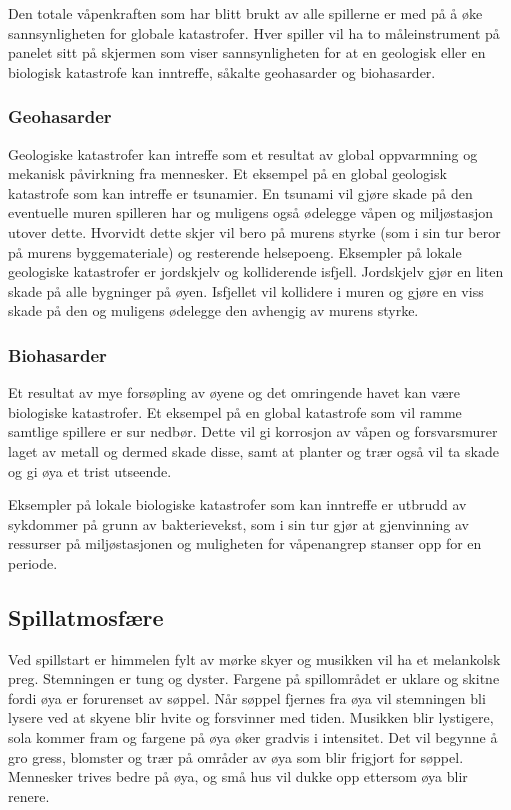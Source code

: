 Den totale våpenkraften som har blitt brukt av alle spillerne er med på å øke sannsynligheten for globale katastrofer. Hver spiller vil ha to måleinstrument på panelet sitt på skjermen som viser sannsynligheten for at en geologisk eller en biologisk katastrofe kan inntreffe, såkalte geohasarder og biohasarder.


\subsubsection{Geohasarder}
Geologiske katastrofer kan intreffe som et resultat av global oppvarmning og mekanisk påvirkning fra mennesker.
Et eksempel på en global geologisk katastrofe som kan intreffe er tsunamier. En tsunami vil gjøre skade på den eventuelle muren spilleren har og muligens også ødelegge våpen og miljøstasjon utover dette. Hvorvidt dette skjer vil bero på murens styrke (som i sin tur beror på murens byggemateriale) og resterende helsepoeng. Eksempler på lokale geologiske katastrofer er jordskjelv og kolliderende isfjell. Jordskjelv gjør en liten skade på alle bygninger på øyen. Isfjellet vil kollidere i muren og gjøre en viss skade på den og muligens ødelegge den avhengig av murens styrke. 


\subsubsection{Biohasarder}
Et resultat av mye forsøpling av øyene og det omringende havet kan være biologiske katastrofer.
Et eksempel på en global katastrofe som vil ramme samtlige spillere er sur nedbør. Dette vil gi korrosjon av våpen og forsvarsmurer laget av metall og dermed skade disse, samt at planter og trær også vil ta skade og gi øya et trist utseende.

Eksempler på lokale biologiske katastrofer som kan inntreffe er utbrudd av sykdommer på grunn av bakterievekst, som i sin tur gjør at gjenvinning av ressurser på miljøstasjonen og muligheten for våpenangrep stanser opp for en periode.


\subsection{Spillatmosfære}

Ved spillstart er himmelen fylt av mørke skyer og musikken vil ha et melankolsk preg. Stemningen er tung og dyster. Fargene på spillområdet er uklare og skitne fordi øya er forurenset av søppel.
Når søppel fjernes fra øya vil stemningen bli lysere ved at skyene blir hvite og forsvinner med tiden. Musikken blir lystigere, sola kommer fram og fargene på øya øker gradvis i intensitet. Det vil begynne å gro gress, blomster og 
trær på områder av øya som blir frigjort for søppel. Mennesker trives bedre på øya, og små hus vil dukke opp ettersom øya blir renere. 

